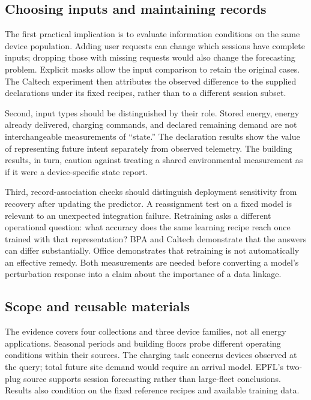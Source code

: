\documentclass[conference,a4paper]{IEEEtran}
\begin{document}
\subsection{Choosing inputs and maintaining records}
The first practical implication is to evaluate information conditions on
the same device population. Adding user requests can change which sessions
have complete inputs; dropping those with missing requests would also
change the forecasting problem. Explicit masks allow the input comparison
to retain the original cases. The Caltech experiment then attributes the
observed difference to the supplied declarations under its fixed recipes,
rather than to a different session subset.

Second, input types should be distinguished by their role. Stored energy,
energy already delivered, charging commands, and declared remaining demand
are not interchangeable measurements of ``state.'' The declaration results
show the value of representing future intent separately from observed
telemetry. The building results, in turn, caution against treating a shared
environmental measurement as if it were a device-specific state report.

Third, record-association checks should distinguish deployment sensitivity
from recovery after updating the predictor. A reassignment test on a fixed
model is relevant to an unexpected integration failure. Retraining asks a
different operational question: what accuracy does the same learning recipe
reach once trained with that representation? BPA and Caltech demonstrate
that the answers can differ substantially. Office demonstrates that
retraining is not automatically an effective remedy. Both measurements are
needed before converting a model's perturbation response into a claim
about the importance of a data linkage.

\subsection{Scope and reusable materials}
The evidence covers four collections and three device families, not all
energy applications. Seasonal periods and building floors probe different
operating conditions within their sources. The charging task concerns
devices observed at the query; total future site demand would require an
arrival model. EPFL's two-plug source supports session forecasting rather
than large-fleet conclusions. Results also condition on the fixed reference
recipes and available training data.
\end{document}
